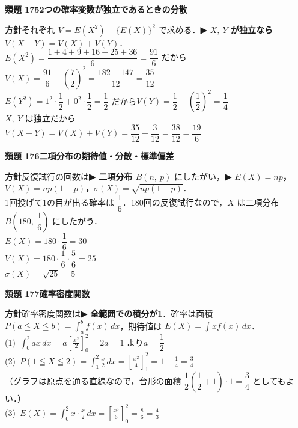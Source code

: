 \documentclass[a4paper,11pt]{ltjsarticle}
\newcommand{\ans}[2]{\Needspace{5\baselineskip}\vspace{6pt}%
  {\sffamily\bfseries 類題 #1\quad #2}\par}
\newcommand{\point}[1]{\textsf{\bfseries ▶ #1}}
\begin{document}
\ans{175}{2つの確率変数が独立であるときの分散}
\begin{kai}
\textbf{方針}\quad それぞれ $V=E(X^2)-\{E(X)\}^2$ で求める．\point{$X,\ Y$ が独立なら $V(X+Y)=V(X)+V(Y)$}．\\[2pt]
$E(X^2)=\dfrac{1+4+9+16+25+36}{6}=\dfrac{91}6$ だから\\
\hspace*{1.5em}$V(X)=\dfrac{91}6-\left(\dfrac72\right)^2=\dfrac{182-147}{12}=\dfrac{35}{12}$\\[2pt]
$E(Y^2)=1^2\cdot\dfrac12+0^2\cdot\dfrac12=\dfrac12$ だから\quad $V(Y)=\dfrac12-\left(\dfrac12\right)^2=\dfrac14$\\[2pt]
$X,\ Y$ は独立だから\\
\hspace*{1.5em}$V(X+Y)=V(X)+V(Y)=\dfrac{35}{12}+\dfrac3{12}=\dfrac{38}{12}=\dfrac{19}6$
\end{kai}

\ans{176}{二項分布の期待値・分散・標準偏差}
\begin{kai}
\textbf{方針}\quad 反復試行の回数は\point{二項分布 $B(n,\ p)$} にしたがい，\point{$E(X)=np$，$V(X)=np(1-p)$，$\sigma(X)=\sqrt{np(1-p)}$}．\\[2pt]
1回投げて1の目が出る確率は $\dfrac16$．180回の反復試行なので，$X$ は二項分布 $B\left(180,\ \dfrac16\right)$ にしたがう．\\[2pt]
$E(X)=180\cdot\dfrac16=30$\\
$V(X)=180\cdot\dfrac16\cdot\dfrac56=25$\\
$\sigma(X)=\sqrt{25}=5$
\end{kai}

\ans{177}{確率密度関数}
\begin{kai}
\textbf{方針}\quad 確率密度関数は\point{全範囲での積分が1}．確率は面積 $P(a\leqq X\leqq b)=\displaystyle\int_a^bf(x)\,dx$，期待値は $E(X)=\displaystyle\int xf(x)\,dx$．\\[2pt]
(1)\ $\displaystyle\int_0^2ax\,dx=a\left[\frac{x^2}2\right]_0^2=2a=1$ より\quad $a=\dfrac12$\\[2pt]
(2)\ $P(1\leqq X\leqq2)=\displaystyle\int_1^2\frac x2\,dx=\left[\frac{x^2}4\right]_1^2=1-\frac14=\frac34$\\
\hspace*{1.5em}（グラフは原点を通る直線なので，台形の面積 $\dfrac12\left(\dfrac12+1\right)\cdot1=\dfrac34$ としてもよい．）\\[2pt]
(3)\ $E(X)=\displaystyle\int_0^2x\cdot\frac x2\,dx=\left[\frac{x^3}6\right]_0^2=\frac86=\frac43$
\end{kai}
\end{document}
